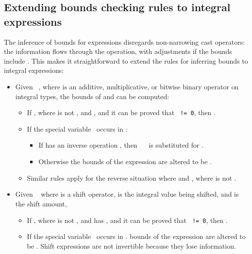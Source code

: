 \subsection{Extending bounds checking rules to integral
expressions}

The inference of bounds for expressions disregards non-narrowing cast operators:
the  information flows through the operation, with adjustments if the bounds
include \exprcurrentvalue.  This makes it straightforward to extend the
rules for inferring bounds to integral expressions:

\begin{itemize}
\item
  Given \texttt{  }, where  is an additive, multiplicative, or bitwise
  binary operator on integral types, the bounds of  and  can be
  computed:

  \begin{itemize}
  \item
    If , where  is not \boundsunknown, and 
    , and it can be proved that \texttt{ != 0}, then
    .
  \item
    If the special variable \exprcurrentvalue\ occurs in :
    \begin{itemize}
    \item
      If  has an inverse operation , then 
      \texttt{\exprcurrentvalue\  }
      is substituted for \exprcurrentvalue.
    \item
      Otherwise the bounds of the expression are altered to be \boundsunknown.
    \end{itemize}
  \item
    Similar rules apply for the reverse situation where 
    and , where  is not \boundsunknown.
  \end{itemize}
\item
  Given \texttt{  } where  is a shift operator,  is the integral value
  being shifted, and  is the shift amount,

  \begin{itemize}
  \item
    If , where  is not \boundsunknown, and  has
    \boundsunknown, and it can be proved that \texttt{ != 0}, then .
  \item
    If the special variable \exprcurrentvalue\ occurs in .
    bounds of the expression are altered to be \boundsunknown. Shift
    expressions are not invertible because they lose information.
  \end{itemize}
\end{itemize}

